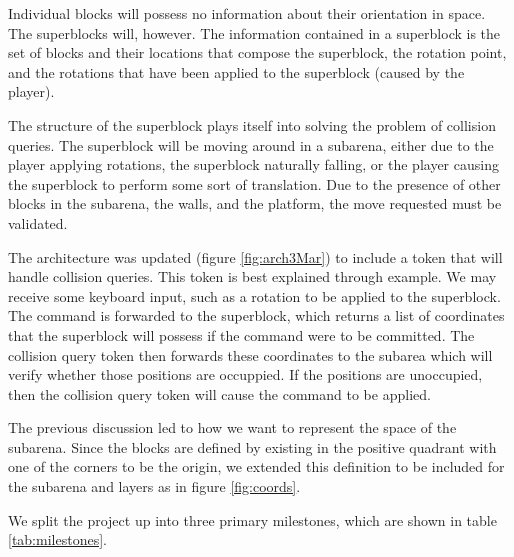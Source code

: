 
Individual blocks will possess no information about their orientation in space.
The superblocks will, however. The information contained in a superblock is the
set of blocks and their locations that compose the superblock, the rotation
point, and the rotations that have been applied to the superblock (caused by
the player).

The structure of the superblock plays itself into solving the problem of
collision queries. The superblock will be moving around in a subarena, either
due to the player applying rotations, the superblock naturally falling, or the
player causing the superblock to perform some sort of translation. Due to the
presence of other blocks in the subarena, the walls, and the platform, the move
requested must be validated.

The architecture was updated (figure \ref{fig:arch3Mar}) to include a token
that will handle collision queries. This token is best explained through
example. We may receive some keyboard input, such as a rotation to be applied
to the superblock. The command is forwarded to the superblock, which returns a
list of coordinates that the superblock will possess if the command were to be
committed. The collision query token then forwards these coordinates to the
subarea which will verify whether those positions are occuppied. If the
positions are unoccupied, then the collision query token will cause the command
to be applied.

The previous discussion led to how we want to represent the space of the
subarena. Since the blocks are defined by existing in the positive quadrant
with one of the corners to be the origin, we extended this definition to be
included for the subarena and layers as in figure \ref{fig:coords}.

We split the project up into three primary milestones, which are shown in table \ref{tab:milestones}.

